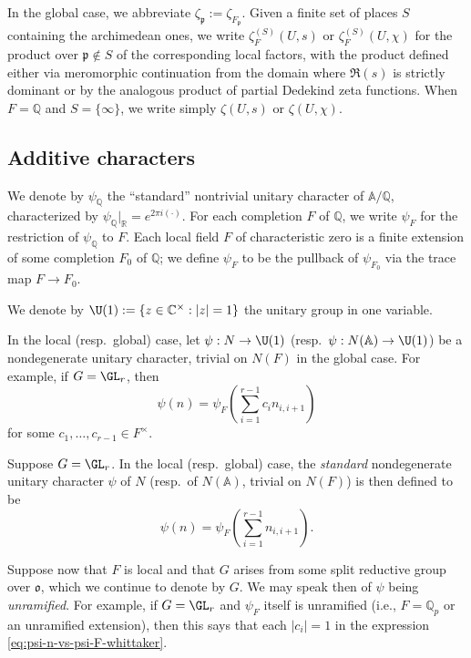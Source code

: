 In the global case, we abbreviate $\zeta_\mathfrak{p} := \zeta_{F_\mathfrak{p}}$.  Given a finite set of places $S$ containing the archimedean ones, we write $\zeta_F^{(S)}(U,s)$ or $\zeta_F^{(S)}(U,\chi)$ for the product over $\mathfrak{p} \notin S$  of the corresponding local factors, with the product defined either via meromorphic continuation from the domain where $\Re(s)$ is strictly dominant or by the analogous product of partial Dedekind zeta functions.  When $F = \mathbb{Q}$ and $S = \{\infty\}$, we write simply $\zeta(U,s)$ or $\zeta(U,\chi)$.

\subsection{Additive characters}\label{sec:stand-nond-char}
We denote by $\psi_{\mathbb{Q}}$ the ``standard'' nontrivial unitary character of $\mathbb{A}/\mathbb{Q}$, characterized by $\psi_{\mathbb{Q}}|_{\mathbb{R}} = e^{2 \pi i (\cdot)}$.  For each completion $F$ of $\mathbb{Q}$, we write $\psi_F$ for the restriction of $\psi_{\mathbb{Q}}$ to $F$.  Each local field $F$ of characteristic zero is a finite extension of some completion $F_0$ of $\mathbb{Q}$; we define $\psi_F$ to be the pullback of $\psi_{F_0}$ via the trace map $F \rightarrow F_0$.

We denote by $\U(1) := \{z \in \mathbb{C}^\times : |z| = 1\}$ the unitary group in one variable.

In the local (resp.\ global) case, let $\psi : N \rightarrow \U(1)$ (resp.\ $\psi : N(\mathbb{A}) \rightarrow \U(1)$) be a nondegenerate unitary character, trivial on $N(F)$ in the global case.  For example, if $G = \GL_r$, then
\begin{equation}\label{eq:psi-n-vs-psi-F-whittaker}
  \psi(n) = \psi_F\left(\sum_{i=1}^{r-1} c_i n_{i,i+1}\right)
\end{equation}
for some $c_1,\dotsc,c_{r-1} \in F^\times$.

Suppose $G = \GL_r$.  In the local (resp.\ global) case, the \emph{standard} nondegenerate unitary character $\psi$ of $N$ (resp.\ of $N(\mathbb{A})$, trivial on $N(F)$) is then defined to be
\begin{equation}\label{eq:psin-=-psi_f}
  \psi(n) = \psi_{F} \left( \sum_{i=1}^{r-1} n_{i,i+1} \right).
\end{equation}

Suppose now that $F$ is local and that $G$ arises from some split reductive group over $\mathfrak{o}$, which we continue to denote by $G$.  We may speak then of $\psi$ being \emph{unramified}.  For example, if $G = \GL_r$ and $\psi_F$ itself is unramified (i.e., $F = \mathbb{Q}_p$ or an unramified extension), then this says that each $|c_i| = 1$ in the expression \eqref{eq:psi-n-vs-psi-F-whittaker}.

